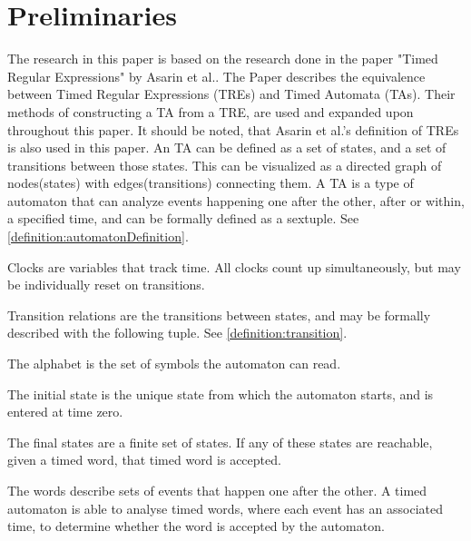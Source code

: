 \section{Preliminaries}\label{sec:preliminaries}






The research in this paper is based on the research done in the paper "Timed Regular Expressions" by Asarin et al.\cite{Eugene2001}. The Paper describes the equivalence between Timed Regular Expressions (TREs) and Timed Automata (TAs). Their methods of constructing a TA from a TRE, are used and expanded upon throughout this paper. It should be noted, that Asarin et al.'s definition of TREs is also used in this paper.
An TA can be defined as a set of states, and a set of transitions between those states. This can be visualized as a directed graph of nodes(states) with edges(transitions) connecting them.
A TA is a type of automaton that can analyze events happening one after the other, after or within, a specified time, and can be formally defined as a sextuple\cite{ALUR1994}. See \cref{definition:automatonDefinition}.


Clocks are variables that track time. All clocks count up simultaneously, but may be individually reset on transitions.

Transition relations are the transitions between states, and may be formally described with the following tuple. See \cref{definition:transition}.


The alphabet is the set of symbols the automaton can read.

The initial state is the unique state from which the automaton starts, and is entered at time zero.

The final states are a finite set of states. If any of these states are reachable, given a timed word, that timed word is accepted.

The words describe sets of events that happen one after the other. A timed automaton is able to analyse timed words, where each event has an associated time, to determine whether the word is accepted by the automaton.
